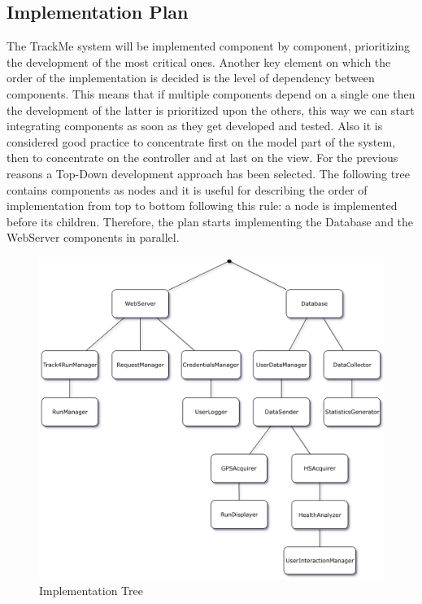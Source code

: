 \subsection{Implementation Plan}
The TrackMe system will be implemented component by component, prioritizing the development of the most critical ones. Another key element on which the order of the implementation is decided is the level of dependency between components. This means that if multiple components depend on a single one then the development of the latter is prioritized upon the others, this way we can start integrating components as soon as they get developed and tested. Also it is considered good practice to concentrate first on the model part of the system, then to concentrate on the controller and at last on the view. For the previous reasons a Top-Down development approach has been selected.
\medbreak
\noindent
The following tree contains components as nodes and it is useful for describing the order of implementation from top to bottom following this rule: a node is implemented before its children. Therefore, the plan starts implementing the Database and the WebServer components in parallel.

\begin{figure}[H]
\centering
\includegraphics[scale=0.6]{Images/ImplementationPlan.png}
\caption{Implementation Tree}
\end{figure}

